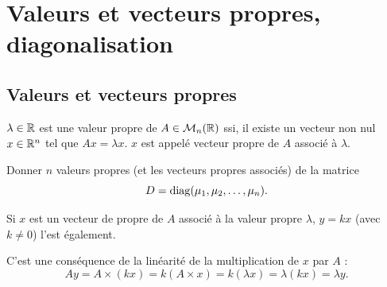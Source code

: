 \section{Valeurs et vecteurs propres, diagonalisation} \label{sec:LinAlg-Eigen}

\subsection{Valeurs et vecteurs propres} \label{sec:ValVecPropres}

\begin{definition}
  $\lambda \in \mathbb{R}$ est une valeur propre de $A \in \mathcal{M}_n(\mathbb{R})$ ssi, il existe un vecteur non nul $x \in \mathbb{R}^n$ tel que $A x = \lambda x$. $x$ est appelé vecteur propre de $A$ associé à $\lambda$.
\end{definition}

\begin{exercise*}
  Donner $n$ valeurs propres (et les vecteurs propres associés) de la matrice 
  $$
  D = \operatorname{diag}(\mu_1, \mu_2, \dots, \mu_n).
  $$
\end{exercise*}


\begin{proposition}
  Si $x$ est un vecteur de propre de $A$ associé à la valeur propre $\lambda$, $y = k x$ (avec $k \neq 0$) l'est également.
\end{proposition}

\proof 
  C'est une conséquence de la linéarité de la multiplication de $x$ par $A$ : 
  $$
  A y = A \times (k x) = k (A \times x) = k (\lambda x) = \lambda (k x) = \lambda y.
  $$
\eproof

